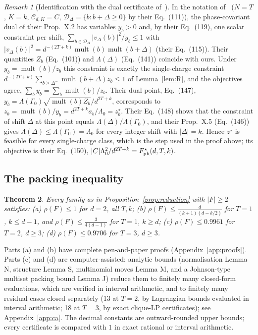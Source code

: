 \documentclass[11pt]{article}
\newcommand{\mult}{\operatorname{mult}}
\newtheorem{theorem}{Theorem}
\theoremstyle{definition}
\theoremstyle{remark}
\newtheorem{remark}[theorem]{Remark}
\begin{document}
\begin{remark}[Identification with the dual certificate of~\cite{Herasymenko2026}]\label{rem:torusdual}
In the notation of~\cite[Sec.~X]{Herasymenko2026} ($N=T$, $K=k$, $\mathcal C_{d,K}=C$, $\mathcal D_\Delta=\{b:b+\Delta\ge0\}$ by their Eq.~(111)), the
phase-covariant dual of their Prop.~X.2 has variables $y_b>0$ and, by their Eq.~(119), one scalar constraint per shift,
$\sum_{b\in\mathcal D_\Delta}|v_\Delta(b)|^2/y_b\le1$ with $|v_\Delta(b)|^2=d^{-(2T+k)}\mult(b)\mult(b+\Delta)$ (their Eq.~(115)). Their quantities $Z_b$
(Eq.~(101)) and $\Lambda(\Delta)$ (Eq.~(141)) coincide with ours. Under $y_b=\mult(b)/z_b$ this constraint is exactly the single-charge
constraint $d^{-(2T+k)}\sum_{b\ge\Delta^-}\mult(b+\Delta)z_b\le1$ of Lemma~\ref{lem:R}, and the objectives agree, $\sum_by_b=\sum_b\mult(b)/z_b$. Their dual
point, Eq.~(147), $y_b=\Lambda(\Gamma_0)\sqrt{\mult(b)Z_b}/d^{2T+k}$, corresponds to $z_b=\mult(b)/y_b=d^{2T+k}a_b/\Lambda_0=z^\star_b$. Their Eq.~(148)
shows that the constraint of shift $\Delta$ at this point equals $\Lambda(\Delta)/\Lambda(\Gamma_0)$, and their Prop.~X.5 (Eq.~(146)) gives
$\Lambda(\Delta)\le\Lambda(\Gamma_0)=\Lambda_0$ for every integer shift with $|\Delta|=k$. Hence $z^\star$ is feasible for every single-charge class,
which is the step used in the proof above; its objective is their Eq.~(150), $|C|\Lambda_0^2/d^{2T+k}=F^\star_{\rm ph}(d,T,k)$.
\end{remark}

\subsection{The packing inequality}
\begin{theorem}\label{thm:packing}
Every family as in Proposition~\ref{prop:reduction} with $|F|\ge2$ satisfies:
(a) $\rho(F)\le1$ for $d=2$, all $T,k$;
(b) $\rho(F)\le\frac{d}{(k+1)(d-k/2)}$ for $T=1$, $k\le d-1$, and $\rho(F)\le\frac{3}{4(d-1)}$ for $T=1$, $k\ge d$;
(c) $\rho(F)\le0.9961$ for $T=2$, $d\ge3$;
(d) $\rho(F)\le0.9706$ for $T=3$, $d\ge3$.
\end{theorem}
Parts (a) and (b) have complete pen-and-paper proofs (Appendix~\ref{app:proofs}). Parts (c) and (d) are computer-assisted:
analytic bounds (normalisation Lemma N, structure Lemma S, multinomial moves Lemma M, and a Johnson-type multiset packing
bound Lemma J) reduce them to finitely many closed-form evaluations, which are verified in interval arithmetic, and to finitely
many residual cases closed separately (13 at $T=2$, by Lagrangian bounds evaluated in interval arithmetic; 18 at $T=3$, by exact
clique-LP certificates); see Appendix~\ref{app:ca}. The decimal constants are
outward-rounded upper bounds; every certificate is compared with $1$ in exact rational or interval arithmetic.
\end{document}
